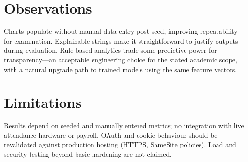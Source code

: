 \section{Observations}
Charts populate without manual data entry post-seed, improving repeatability for examination. Explainable strings make it straightforward to justify outputs during evaluation. Rule-based analytics trade some predictive power for transparency---an acceptable engineering choice for the stated academic scope, with a natural upgrade path to trained models using the same feature vectors.

\section{Limitations}
Results depend on seeded and manually entered metrics; no integration with live attendance hardware or payroll. OAuth and cookie behaviour should be revalidated against production hosting (HTTPS, SameSite policies). Load and security testing beyond basic hardening are not claimed.
